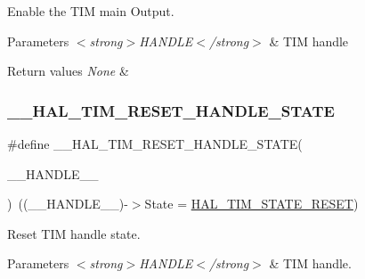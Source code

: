 Enable the T\+IM main Output. 


\begin{DoxyParams}{Parameters}
{\em $<$strong$>$\+H\+A\+N\+D\+L\+E$<$/strong$>$} & T\+IM handle \\
\hline
\end{DoxyParams}

\begin{DoxyRetVals}{Return values}
{\em None} & \\
\hline
\end{DoxyRetVals}
\mbox{\label{group___t_i_m___exported___macros_gace20fd4e38231b9682fbc83a80ec19a3}} 
\subsubsection{\texorpdfstring{\+\_\+\+\_\+\+H\+A\+L\+\_\+\+T\+I\+M\+\_\+\+R\+E\+S\+E\+T\+\_\+\+H\+A\+N\+D\+L\+E\+\_\+\+S\+T\+A\+TE}{\_\_HAL\_TIM\_RESET\_HANDLE\_STATE}}
{\footnotesize\ttfamily \#define \+\_\+\+\_\+\+H\+A\+L\+\_\+\+T\+I\+M\+\_\+\+R\+E\+S\+E\+T\+\_\+\+H\+A\+N\+D\+L\+E\+\_\+\+S\+T\+A\+TE(\begin{DoxyParamCaption}\item[{}]{\+\_\+\+\_\+\+H\+A\+N\+D\+L\+E\+\_\+\+\_\+ }\end{DoxyParamCaption})~((\+\_\+\+\_\+\+H\+A\+N\+D\+L\+E\+\_\+\+\_\+)-\/$>$State = \hyperlink{group___t_i_m___exported___types_ggae0994cf5970e56ca4903e9151f40010ca28011b79e60b74a6c55947c505c51cbc}{H\+A\+L\+\_\+\+T\+I\+M\+\_\+\+S\+T\+A\+T\+E\+\_\+\+R\+E\+S\+ET})}



Reset T\+IM handle state. 


\begin{DoxyParams}{Parameters}
{\em $<$strong$>$\+H\+A\+N\+D\+L\+E$<$/strong$>$} & T\+IM handle. \\
\hline
\end{DoxyParams}

